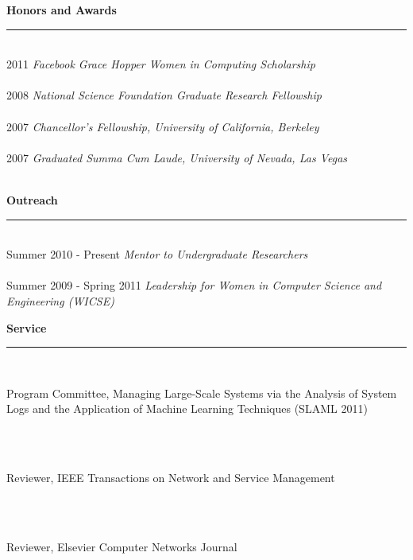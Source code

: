 \documentclass[11pt]{article}
\newcommand{\pagewidth}{6.5 in}
\newcommand{\tabwidth}{2.0 in}
\newcommand{\head}[1]{
{\bf #1} \\
\rule{\textwidth}{0.01 in}

\vspace{-0.35 in}

}
\begin{document}
\head{Honors and Awards}

\begin{tabbing}
\hspace{\tabwidth} \= \\

2011 \> \emph{Facebook Grace Hopper Women in Computing Scholarship}\\ \\

2008 \> \emph{National Science Foundation Graduate Research Fellowship} \\ \\

2007 \> \emph{Chancellor's Fellowship, University of California, Berkeley} \\ \\

2007 \> \emph{Graduated Summa Cum Laude, University of Nevada, Las Vegas} \\ \\
\end{tabbing}



\head{Outreach}

\begin{tabbing}
\hspace{\tabwidth} \= \\

Summer 2010 - Present \> \emph{Mentor to Undergraduate Researchers}\\ \\

Summer 2009 - Spring 2011 \> \emph{Leadership for Women in Computer Science and Engineering (WICSE)} \\
\end{tabbing}


\head{Service}

\begin{tabbing}
\hspace{\tabwidth} \= \\

\parbox[t]{\pagewidth}{Program Committee, Managing Large-Scale Systems via the Analysis of System Logs and the Application of Machine Learning Techniques (SLAML 2011)}\\ \\
\parbox[t]{\pagewidth}{Reviewer, IEEE Transactions on Network and Service Management}\\ \\
\parbox[t]{\pagewidth}{Reviewer, Elsevier Computer Networks Journal}

\end{tabbing}
\end{document}
